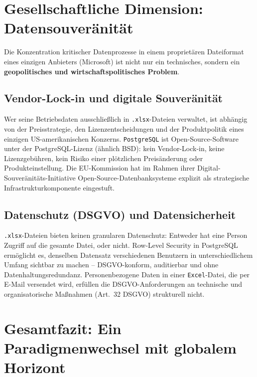 ﻿\documentclass[12pt,a4paper]{report}
\theoremstyle{definition}
\theoremstyle{remark}
\newcommand{\excel}{\texttt{Excel}}
\newcommand{\pg}{\texttt{PostgreSQL}}
\newcommand{\code}[1]{\texttt{#1}}
\begin{document}
\section{Gesellschaftliche Dimension: Datensouveränität}

Die Konzentration kritischer Datenprozesse in einem proprietären
Dateiformat eines einzigen Anbieters (Microsoft) ist nicht nur ein
technisches, sondern ein \textbf{geopolitisches und
wirtschaftspolitisches Problem}.

\subsection{Vendor-Lock-in und digitale Souveränität}

Wer seine Betriebsdaten ausschließlich in \code{.xlsx}-Dateien
verwaltet, ist abhängig von der Preisstrategie, den
Lizenzentscheidungen und der Produktpolitik eines einzigen
US-amerikanischen Konzerns.
\pg{} ist Open-Source-Software unter der PostgreSQL-Lizenz
(ähnlich BSD): kein Vendor-Lock-in, keine Lizenzgebühren,
kein Risiko einer plötzlichen Preisänderung oder Produkteinstellung.
Die EU-Kommission hat im Rahmen ihrer Digital-Souveränitäts-Initiative
Open-Source-Datenbanksysteme explizit als strategische
Infrastrukturkomponente eingestuft.

\subsection{Datenschutz (DSGVO) und Datensicherheit}

\code{.xlsx}-Dateien bieten keinen granularen Datenschutz:
Entweder hat eine Person Zugriff auf die gesamte Datei, oder nicht.
Row-Level Security in PostgreSQL ermöglicht es, denselben Datensatz
verschiedenen Benutzern in unterschiedlichem Umfang sichtbar zu machen
-- DSGVO-konform, auditierbar und ohne Datenhaltungsredundanz.
Personenbezogene Daten in einer \excel-Datei, die per E-Mail versendet
wird, erfüllen die DSGVO-Anforderungen an technische und
organisatorische Maßnahmen (Art.~32 DSGVO) strukturell nicht.

\section{Gesamtfazit: Ein Paradigmenwechsel mit globalem Horizont}
\end{document}
